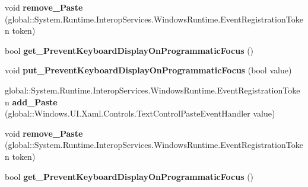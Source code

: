 \begin{DoxyCompactItemize}
\mbox{\label{interface_windows_1_1_u_i_1_1_xaml_1_1_controls_1_1_i_text_box2_a269082d94ab6b91935799f8f5f0b945d}} 
void {\bfseries remove\+\_\+\+Paste} (global\+::\+System.\+Runtime.\+Interop\+Services.\+Windows\+Runtime.\+Event\+Registration\+Token token)
\item 
\mbox{\label{interface_windows_1_1_u_i_1_1_xaml_1_1_controls_1_1_i_text_box2_a8af2302feaec834a42dc8d7416d40f7e}} 
bool {\bfseries get\+\_\+\+Prevent\+Keyboard\+Display\+On\+Programmatic\+Focus} ()
\item 
\mbox{\label{interface_windows_1_1_u_i_1_1_xaml_1_1_controls_1_1_i_text_box2_ab3b1068c9dd07e6d49f63070a27551f4}} 
void {\bfseries put\+\_\+\+Prevent\+Keyboard\+Display\+On\+Programmatic\+Focus} (bool value)
\item 
\mbox{\label{interface_windows_1_1_u_i_1_1_xaml_1_1_controls_1_1_i_text_box2_af0c1b156b0a6aa5c1695e2b35cee2f48}} 
global\+::\+System.\+Runtime.\+Interop\+Services.\+Windows\+Runtime.\+Event\+Registration\+Token {\bfseries add\+\_\+\+Paste} (global\+::\+Windows.\+U\+I.\+Xaml.\+Controls.\+Text\+Control\+Paste\+Event\+Handler value)
\item 
\mbox{\label{interface_windows_1_1_u_i_1_1_xaml_1_1_controls_1_1_i_text_box2_a269082d94ab6b91935799f8f5f0b945d}} 
void {\bfseries remove\+\_\+\+Paste} (global\+::\+System.\+Runtime.\+Interop\+Services.\+Windows\+Runtime.\+Event\+Registration\+Token token)
\item 
\mbox{\label{interface_windows_1_1_u_i_1_1_xaml_1_1_controls_1_1_i_text_box2_a8af2302feaec834a42dc8d7416d40f7e}} 
bool {\bfseries get\+\_\+\+Prevent\+Keyboard\+Display\+On\+Programmatic\+Focus} ()
\item 
\mbox{\label{interface_windows_1_1_u_i_1_1_xaml_1_1_controls_1_1_i_text_box2_ab3b1068c9dd07e6d49f63070a27551f4}} 

\end{DoxyCompactItemize}
